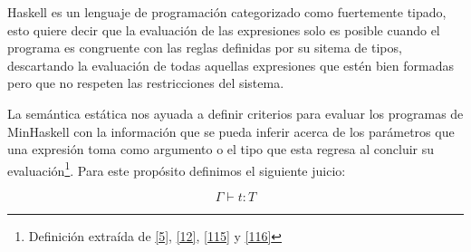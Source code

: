    \textsf{Haskell} es un lenguaje de programación categorizado como fuertemente tipado, esto quiere decir que la evaluación de las expresiones solo es posible cuando el programa es congruente con las reglas definidas por su sitema de tipos, descartando la evaluación de todas aquellas expresiones que estén bien formadas pero que no respeten las restricciones del sistema. \\


    \begin{definition}
       La semántica estática nos ayuada a definir criterios para evaluar los programas de \textsf{MinHaskell} con la información que se pueda inferir acerca de los parámetros que una expresión toma como argumento o el tipo que esta regresa al concluir su evaluación\footnote{Definición extraída de  \hyperlink{5}{[5]},  \hyperlink{12}{[12]}, \hyperlink{115}{[115]} y \hyperlink{116}{[116]}}. Para este propósito definimos el siguiente juicio:
    
    $$\Gamma\vdash t: T$$
    

\end{definition}

